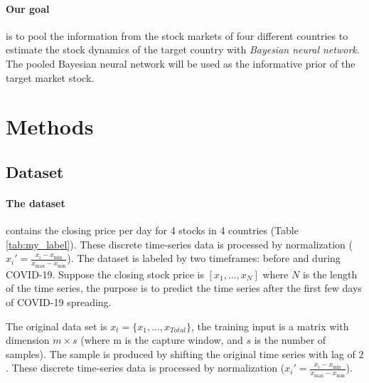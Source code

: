 \documentclass{article}
\begin{document}
\paragraph{Our goal} is to pool the information from the stock markets of four different countries to estimate the stock dynamics of the target country with \textit{Bayesian neural network}. The pooled Bayesian neural network will be used as the informative prior of the target market stock. %



\section{Methods}



\subsection{Dataset}

\paragraph{The dataset} contains the closing price per day for 4 stocks in 4 countries (Table \ref{tab:my_label}). These discrete time-series data is processed by normalization ($x_{i}' = \frac{x_{i} - x_{\min}}{x_{\max} - x_{\min}}$). The dataset is labeled by two timeframes: before and during COVID-19. Suppose the closing stock price is $[x_1, \dots, x_N]$ where $N$ is the length of the time series, the purpose is to predict the time series after the first few days of COVID-19 spreading.



The original data set is $x_t = \{x_{1}, ..., x_{Total}\}$, the training input is a matrix with dimension $m \times s$ (where m is the capture window, and $s$ is the number of samples). The sample is produced by shifting the original time series with lag of $2$.  These discrete time-series data is processed by normalization ($x_{i}' = \frac{x_{i} - x_{\min}}{x_{\max} - x_{\min}}$). 
\end{document}
